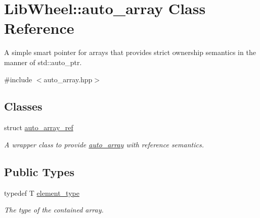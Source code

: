 \hypertarget{classLibWheel_1_1auto__array}{
\section{\-Lib\-Wheel\-:\-:auto\-\_\-array \-Class \-Reference}
\label{classLibWheel_1_1auto__array}
}


\-A simple smart pointer for arrays that provides strict ownership semantics in the manner of std\-::auto\-\_\-ptr.  




{\ttfamily \#include $<$auto\-\_\-array.\-hpp$>$}

\subsection*{\-Classes}
\begin{DoxyCompactItemize}
\item 
struct \hyperlink{structLibWheel_1_1auto__array_1_1auto__array__ref}{auto\-\_\-array\-\_\-ref}
\begin{DoxyCompactList}\small\item\em \-A wrapper class to provide \hyperlink{classLibWheel_1_1auto__array}{auto\-\_\-array} with reference semantics. \end{DoxyCompactList}\end{DoxyCompactItemize}
\subsection*{\-Public \-Types}
\begin{DoxyCompactItemize}
\item 
typedef \-T \hyperlink{classLibWheel_1_1auto__array_a8c06b91597d32a42388eaad80ae5f656}{element\-\_\-type}
\begin{DoxyCompactList}\small\item\em \-The type of the contained array. \end{DoxyCompactList}\end{DoxyCompactItemize}

